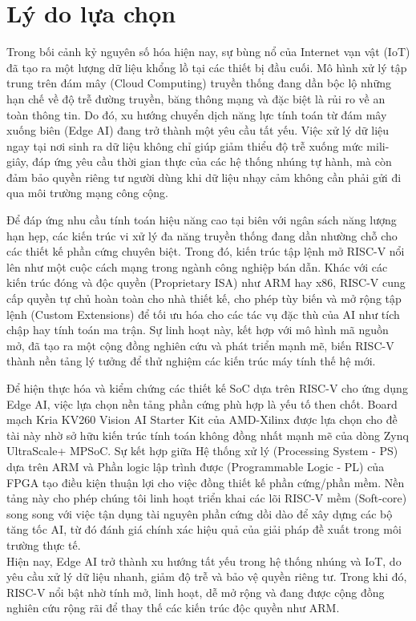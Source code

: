\newpage
\section{Lý do lựa chọn}

Trong bối cảnh kỷ nguyên số hóa hiện nay, sự bùng nổ của Internet vạn vật (IoT) 
đã tạo ra một lượng dữ liệu khổng lồ tại các thiết bị đầu cuối. 
Mô hình xử lý tập trung trên đám mây (Cloud Computing) truyền thống đang dần bộc lộ 
những hạn chế về độ trễ đường truyền, băng thông mạng và đặc biệt là rủi ro về 
an toàn thông tin. Do đó, xu hướng chuyển dịch năng lực tính toán từ đám mây 
xuống biên (Edge AI) đang trở thành một yêu cầu tất yếu. Việc xử lý dữ liệu ngay tại nơi sinh ra dữ liệu không chỉ giúp giảm thiểu độ trễ xuống mức mili-giây, đáp ứng yêu cầu thời gian thực của các hệ thống nhúng tự hành, mà còn đảm bảo quyền riêng tư người dùng khi dữ liệu nhạy cảm không cần phải gửi đi qua môi trường mạng công cộng.

Để đáp ứng nhu cầu tính toán hiệu năng cao tại biên với ngân sách năng lượng hạn hẹp, các kiến trúc vi xử lý đa năng truyền thống đang dần nhường chỗ cho các thiết kế phần cứng chuyên biệt. Trong đó, kiến trúc tập lệnh mở RISC-V nổi lên như một cuộc cách mạng trong ngành công nghiệp bán dẫn. Khác với các kiến trúc đóng và độc quyền (Proprietary ISA) như ARM hay x86, RISC-V cung cấp quyền tự chủ hoàn toàn cho nhà thiết kế, cho phép tùy biến và mở rộng tập lệnh (Custom Extensions) để tối ưu hóa cho các tác vụ đặc thù của AI như tích chập hay tính toán ma trận. Sự linh hoạt này, kết hợp với mô hình mã nguồn mở, đã tạo ra một cộng đồng nghiên cứu và phát triển mạnh mẽ, biến RISC-V thành nền tảng lý tưởng để thử nghiệm các kiến trúc máy tính thế hệ mới.

Để hiện thực hóa và kiểm chứng các thiết kế SoC dựa trên RISC-V cho ứng dụng Edge AI, 
việc lựa chọn nền tảng phần cứng phù hợp là yếu tố then chốt. 
Board mạch Kria KV260 Vision AI Starter Kit của AMD-Xilinx được lựa chọn cho đề tài 
này nhờ sở hữu kiến trúc tính toán không đồng nhất mạnh mẽ của dòng 
Zynq UltraScale+ MPSoC. Sự kết hợp giữa Hệ thống xử lý (Processing System - PS) 
dựa trên ARM và Phần logic lập trình được (Programmable Logic - PL) của 
FPGA tạo điều kiện thuận lợi cho việc đồng thiết kế phần cứng/phần mềm. 
Nền tảng này cho phép chúng tôi linh hoạt triển khai các lõi RISC-V mềm (Soft-core) 
song song với việc tận dụng tài nguyên phần cứng dồi dào để xây dựng các 
bộ tăng tốc AI, từ đó đánh giá chính xác hiệu quả của giải pháp đề xuất 
trong môi trường thực tế.\\
Hiện nay, Edge AI trở thành xu hướng tất yếu trong hệ thống nhúng và IoT, 
do yêu cầu xử lý dữ liệu nhanh, giảm độ trễ và bảo vệ quyền riêng tư.
Trong khi đó, RISC-V nổi bật nhờ tính mở, linh hoạt, dễ mở rộng và đang được 
cộng đồng nghiên cứu rộng rãi để thay thế các kiến trúc độc quyền như ARM.

